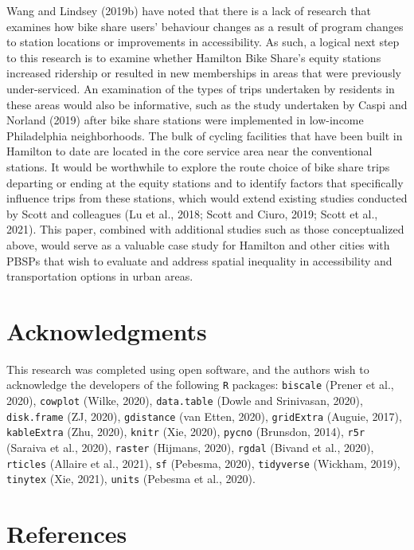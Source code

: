 \documentclass[]{elsarticle} %
\begin{document}
Wang and Lindsey (2019b) have noted that there is a lack of research
that examines how bike share users' behaviour changes as a result of
program changes to station locations or improvements in accessibility.
As such, a logical next step to this research is to examine whether
Hamilton Bike Share's equity stations increased ridership or resulted in
new memberships in areas that were previously under-serviced. An
examination of the types of trips undertaken by residents in these areas
would also be informative, such as the study undertaken by Caspi and
Norland (2019) after bike share stations were implemented in low-income
Philadelphia neighborhoods. The bulk of cycling facilities that have
been built in Hamilton to date are located in the core service area near
the conventional stations. It would be worthwhile to explore the route
choice of bike share trips departing or ending at the equity stations
and to identify factors that specifically influence trips from these
stations, which would extend existing studies conducted by Scott and
colleagues (Lu et al., 2018; Scott and Ciuro, 2019; Scott et al., 2021).
This paper, combined with additional studies such as those
conceptualized above, would serve as a valuable case study for Hamilton
and other cities with PBSPs that wish to evaluate and address spatial
inequality in accessibility and transportation options in urban areas.

\hypertarget{acknowledgments}{%
\section{Acknowledgments}\label{acknowledgments}}

This research was completed using open software, and the authors wish to
acknowledge the developers of the following \texttt{R} packages:
\texttt{biscale} (Prener et al., 2020), \texttt{cowplot} (Wilke, 2020),
\texttt{data.table} (Dowle and Srinivasan, 2020), \texttt{disk.frame}
(ZJ, 2020), \texttt{gdistance} (van Etten, 2020), \texttt{gridExtra}
(Auguie, 2017), \texttt{kableExtra} (Zhu, 2020), \texttt{knitr} (Xie,
2020), \texttt{pycno} (Brunsdon, 2014), \texttt{r5r} (Saraiva et al.,
2020), \texttt{raster} (Hijmans, 2020), \texttt{rgdal} (Bivand et al.,
2020), \texttt{rticles} (Allaire et al., 2021), \texttt{sf} (Pebesma,
2020), \texttt{tidyverse} (Wickham, 2019), \texttt{tinytex} (Xie, 2021),
\texttt{units} (Pebesma et al., 2020).

\hypertarget{references}{%
\section*{References}\label{references}}
\end{document}

